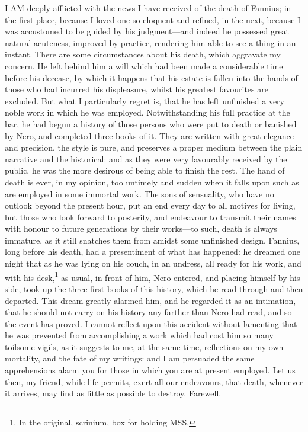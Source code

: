 I AM deeply afflicted with the news I have received of the death of
Fannius; in the first place, because I loved one so eloquent and refined,
in the next, because I was accustomed to be guided by his judgment—and
indeed he possessed great natural acuteness, improved by practice,
rendering him able to see a thing in an instant. There are some
circumstances about his death, which aggravate my concern. He left behind
him a will which had been made a considerable time before his decease, by
which it happens that his estate is fallen into the hands of those who had
incurred his displeasure, whilst his greatest favourites are excluded. But
what I particularly regret is, that he has left unfinished a very noble
work in which he was employed. Notwithstanding his full practice at the
bar, he had begun a history of those persons who were put to death or
banished by Nero, and completed three books of it. They are written with
great elegance and precision, the style is pure, and preserves a proper
medium between the plain narrative and the historical: and as they were
very favourably received by the public, he was the more desirous of being
able to finish the rest. The hand of death is ever, in my opinion, too
untimely and sudden when it falls upon such as are employed in some
immortal work. The sons of sensuality, who have no outlook beyond the
present hour, put an end every day to all motives for living, but those
who look forward to posterity, and endeavour to transmit their names with
honour to future generations by their works—to such, death is always
immature, as it still snatches them from amidst some unfinished design.
Fannius, long before his death, had a presentiment of what has happened:
he dreamed one night that as he was lying on his couch, in an undress, all
ready for his work, and with his desk,\footnote{In the original,
scrinium, box for holding MSS.} as usual, in front of
him, Nero entered, and placing himself by his side, took up the three
first books of this history, which he read through and then departed. This
dream greatly alarmed him, and he regarded it as an intimation, that he
should not carry on his history any farther than Nero had read, and so the
event has proved. I cannot reflect upon this accident without lamenting
that he was prevented from accomplishing a work which had cost him so many
toilsome vigils, as it suggests to me, at the same time, reflections on my
own mortality, and the fate of my writings: and I am persuaded the same
apprehensions alarm you for those in which you are at present employed.
Let us then, my friend, while life permits, exert all our endeavours, that
death, whenever it arrives, may find as little as possible to destroy.
Farewell.

